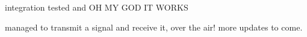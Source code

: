 integration tested and OH MY GOD IT WORKS

managed to transmit a signal and receive it, over the air! more updates to
come.
